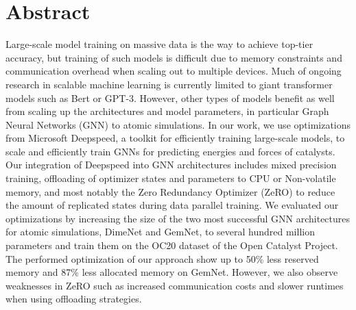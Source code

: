 \section*{Abstract}

Large-scale model training on massive data is the way to achieve top-tier 
accuracy, but training of such models is difficult due to memory constraints and communication overhead 
when scaling out to multiple devices. Much of ongoing research in scalable machine learning is 
currently limited to  giant transformer models such as Bert or GPT-3. However, other types of 
models benefit as well from scaling up the architectures and model parameters, 
in particular Graph Neural Networks (GNN) to atomic simulations. In our work, 
we use optimizations from Microsoft Deepspeed, a toolkit for efficiently training 
large-scale models, to scale and efficiently train GNNs for predicting energies 
and forces of catalysts. Our integration of Deepspeed into GNN architectures includes 
mixed precision training, offloading of optimizer states and parameters to CPU or Non-volatile 
memory, and most notably the Zero Redundancy Optimizer (ZeRO) to reduce the amount of 
replicated states during data parallel training. We evaluated our optimizations by increasing 
the size of the two most successful GNN architectures for atomic simulations, DimeNet 
and GemNet, to several hundred million parameters and train them on the OC20 dataset of 
the Open Catalyst Project. The performed optimization of our approach show up to 
50\% less reserved memory and 87\% less allocated memory on GemNet. However, we also observe 
weaknesses in ZeRO such as increased communication costs and slower 
runtimes when using offloading strategies. 